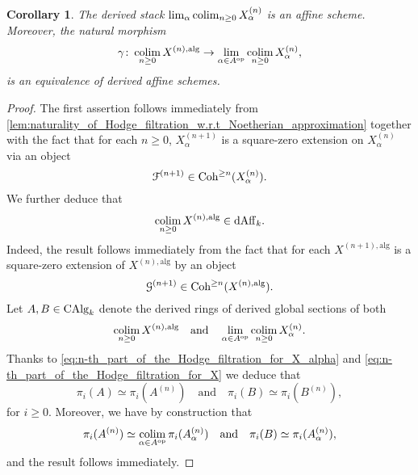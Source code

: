 \documentclass[10pt,a4paper,reqno]{amsart} %
\theoremstyle{plain}
\newtheorem{cor}[thm]{Corollary}
\theoremstyle{definition}
\theoremstyle{remark}
\numberwithin{equation}{section}
\begin{document}
\begin{cor} \label{cor:commutation_between_limit_and_colimit_on_Hodge_filtration}
    The derived stack $\lim_{\alpha} \operatorname*{colim}_{n \ge 0} X_\alpha^{(n)}$ is an affine scheme. Moreover, the natural morphism
        \[
            \gamma \colon \operatorname*{colim}_{n \ge 0} X^{(n), \mathrm{alg}} \to \lim_{\alpha \in A ^\mathrm{op}} \operatorname*{colim}_{n \ge 0} X^{(n)}_\alpha,
        \] 
    is an equivalence of derived affine schemes.
\end{cor}

\begin{proof}
    The first assertion follows immediately from \cref{lem:naturality_of_Hodge_filtration_w.r.t_Noetherian_approximation} together with the fact that
    for each $n \ge 0$, $X^{(n+1)}_\alpha$ is a square-zero extension on $X^{(n)}_\alpha$ via an object
        \begin{equation} \label{eq:n-th_part_of_the_Hodge_filtration_for_X_alpha}
            \mathcal F^{(n+1)} \in \mathrm{Coh}^{\ge n}(X^{(n)}_\alpha).  
        \end{equation}
    We further deduce that
        \[
            \operatorname*{colim}_{n \ge 0} X^{(n), \mathrm{alg}} \in \mathrm{dAff}_k.  
        \]
    Indeed, the result follows immediately from the fact that for each $X^{(n+1), \mathrm{alg}}$ is a square-zero extension of $X^{(n), \mathrm{alg}}$ by an object
        \begin{equation} \label{eq:n-th_part_of_the_Hodge_filtration_for_X}
            \mathcal G^{(n+1)} \in \mathrm{Coh}^{\ge n}(X^{(n), \mathrm{alg}}).  
        \end{equation}
    Let $A, B \in \mathrm{CAlg}_k$ denote the derived rings of derived global sections of both
        \[
            \operatorname*{colim}_{n \ge 0} X^{(n), \mathrm{alg}} \quad \mathrm{and} \quad \lim_{\alpha \in A ^\mathrm{op}} \operatorname*{colim}_{n \ge 0} X^{(n)}_\alpha.
        \]
    Thanks to \eqref{eq:n-th_part_of_the_Hodge_filtration_for_X_alpha} and \eqref{eq:n-th_part_of_the_Hodge_filtration_for_X} we deduce that
        \[
            \pi_i(A) \simeq \pi_i(A^{(n)}) \quad \mathrm{and} \quad \pi_i(B) \simeq \pi_i(B^{(n)}),  
        \]
    for $i \ge 0$. Moreover, we have by construction that
        \[
            \pi_i(A^{(n)}) \simeq \operatorname*{colim}_{\alpha \in A ^\mathrm{op}} \pi_i(A_\alpha^{(n)}) \quad \mathrm{and} \quad \pi_i(B) \simeq \pi_i(A^{(n)}_\alpha),  
        \]
    and the result follows immediately.
\end{proof}
\end{document}
